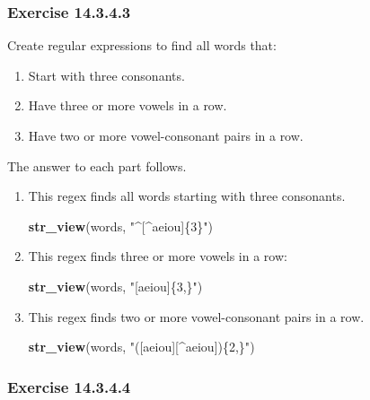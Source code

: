 \documentclass[]{book}
\newenvironment{Shaded}{\begin{snugshade}}{\end{snugshade}}
\newcommand{\KeywordTok}[1]{\textcolor[rgb]{0.13,0.29,0.53}{\textbf{#1}}}
\newcommand{\NormalTok}[1]{#1}
\newcommand{\StringTok}[1]{\textcolor[rgb]{0.31,0.60,0.02}{#1}}
\providecommand{\tightlist}{%
  \setlength{\itemsep}{0pt}\setlength{\parskip}{0pt}}
\theoremstyle{plain}
\theoremstyle{remark}
\begin{document}
\hypertarget{exercise-14.3.4.3}{%
\subsubsection*{\texorpdfstring{Exercise
{14.3.4.3}}{Exercise 14.3.4.3}}\label{exercise-14.3.4.3}}

Create regular expressions to find all words that:

\begin{enumerate}
\def\labelenumi{\arabic{enumi}.}
\tightlist
\item
  Start with three consonants.
\item
  Have three or more vowels in a row.
\item
  Have two or more vowel-consonant pairs in a row.
\end{enumerate}

The answer to each part follows.

\begin{enumerate}
\def\labelenumi{\arabic{enumi}.}
\item
  This regex finds all words starting with three consonants.

\begin{Shaded}
\begin{Highlighting}[]
\KeywordTok{str_view}\NormalTok{(words, }\StringTok{"^[^aeiou]\{3\}"}\NormalTok{)}
\end{Highlighting}
\end{Shaded}
\item
  This regex finds three or more vowels in a row:

\begin{Shaded}
\begin{Highlighting}[]
\KeywordTok{str_view}\NormalTok{(words, }\StringTok{"[aeiou]\{3,\}"}\NormalTok{)}
\end{Highlighting}
\end{Shaded}
\item
  This regex finds two or more vowel-consonant pairs in a row.

\begin{Shaded}
\begin{Highlighting}[]
\KeywordTok{str_view}\NormalTok{(words, }\StringTok{"([aeiou][^aeiou])\{2,\}"}\NormalTok{)}
\end{Highlighting}
\end{Shaded}
\end{enumerate}

\hypertarget{exercise-14.3.4.4}{%
\subsubsection*{\texorpdfstring{Exercise
{14.3.4.4}}{Exercise 14.3.4.4}}\label{exercise-14.3.4.4}}
\end{document}
